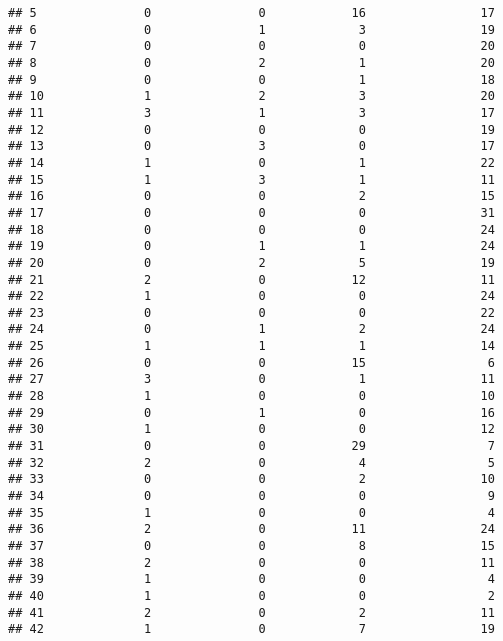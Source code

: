 \documentclass[
]{article}
\begin{document}
\begin{verbatim}
## 5               0               0            16                17
## 6               0               1             3                19
## 7               0               0             0                20
## 8               0               2             1                20
## 9               0               0             1                18
## 10              1               2             3                20
## 11              3               1             3                17
## 12              0               0             0                19
## 13              0               3             0                17
## 14              1               0             1                22
## 15              1               3             1                11
## 16              0               0             2                15
## 17              0               0             0                31
## 18              0               0             0                24
## 19              0               1             1                24
## 20              0               2             5                19
## 21              2               0            12                11
## 22              1               0             0                24
## 23              0               0             0                22
## 24              0               1             2                24
## 25              1               1             1                14
## 26              0               0            15                 6
## 27              3               0             1                11
## 28              1               0             0                10
## 29              0               1             0                16
## 30              1               0             0                12
## 31              0               0            29                 7
## 32              2               0             4                 5
## 33              0               0             2                10
## 34              0               0             0                 9
## 35              1               0             0                 4
## 36              2               0            11                24
## 37              0               0             8                15
## 38              2               0             0                11
## 39              1               0             0                 4
## 40              1               0             0                 2
## 41              2               0             2                11
## 42              1               0             7                19

\end{verbatim}
\end{document}
